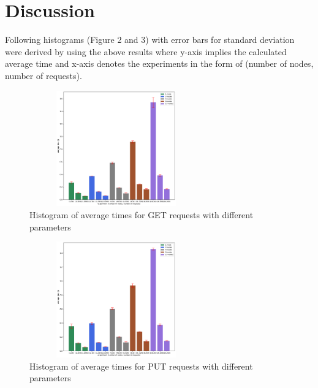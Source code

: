 \documentclass[
    a4paper,
    twocolumn,
]{article}
\begin{document}
\begin{table}[!ht]
	\renewcommand{\arraystretch}{1.4}
	\centering
	\caption{Results of experiment 3 with average times for stabilization}
\end{table}

\section{Discussion}

Following histograms (Figure 2 and 3) with error bars for standard deviation~\cite{2} were derived by using the above results where y-axis implies the calculated average time and x-axis denotes the experiments in the form of (number of nodes, number of requests).\\

\setlength{\intextsep}{10pt plus 2pt minus 0pt}
\begin{figure}[!ht]
	\centering
	\includegraphics[width=7.5cm, height=5cm]{get.pdf}
	\caption{Histogram of average times for GET requests with different parameters}
\end{figure}

\setlength{\intextsep}{5pt plus 2pt minus 0pt}
\begin{figure}[!ht]
	\centering
	\includegraphics[width=7.5cm, height=5cm]{put.pdf}
	\caption{Histogram of average times for PUT requests with different parameters}
\end{figure}
\end{document}
